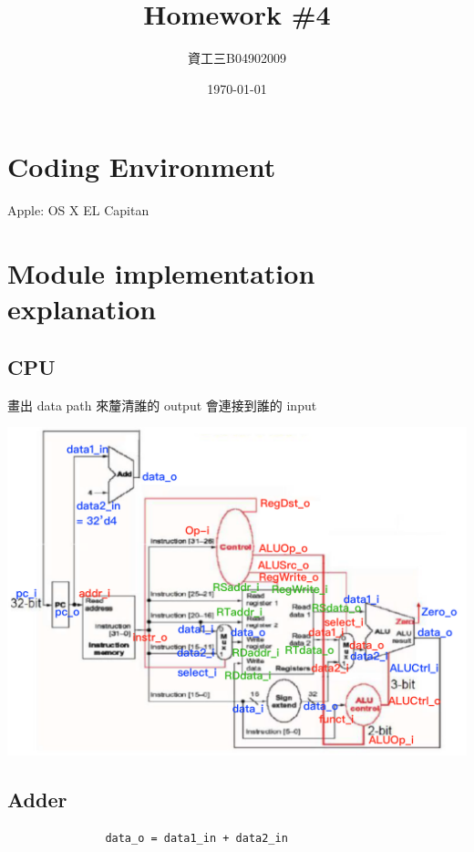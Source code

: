 \documentclass[12t, a4paper]{article}
\title{\vspace{-4ex}\bf{\LARGE{Homework \#4}}}
\author{資工三\space B04902009\space蕭千惠} %
\date{\vspace{-2ex}\today\vspace{-4ex}}
\begin{document}
	\begin{CJK}{UTF8}{bkai}
	\maketitle\thispagestyle{fancy}
	\fontsize{12pt}{16pt} \selectfont
	\section{Coding Environment}
		Apple: OS X EL Capitan

	\section{Module implementation explanation}
		\subsection{CPU}
			畫出 data path 來釐清誰的 output 會連接到誰的 input \\
			\centerline{\includegraphics[width=15cm, keepaspectratio=true]{data_path.png}} \par
		
		\subsection{Adder}
			\begin{verbatim}
			   data_o = data1_in + data2_in
			\end{verbatim}	
		

\end{CJK}
\end{document}
